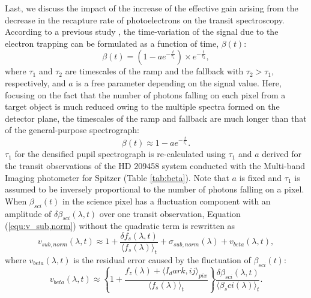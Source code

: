 \documentclass{aastex62}
\def\hoge<#1>{\langle #1 \rangle}
\begin{document}
Last, we discuss the impact of the increase of the effective gain arising from the decrease in the recapture rate of photoelectrons on the transit spectroscopy. According to a previous study \citep{2012ApJ...752...81C}, the time-variation of the signal due to the electron trapping can be formulated as a function of time, $\beta(t)$:
\begin{equation}
\beta(t) = (1-ae^{-\frac{t}{\tau_{1}}}){\times}e^{-\frac{t}{\tau_{2}}} ,
\end{equation}
where $\tau_{1}$ and $\tau_{2}$ are timescales of the ramp and the fallback with $\tau_{2}>\tau_{1}$, respectively, and $a$ is a free parameter depending on the signal value. Here, focusing on the fact that the number of photons falling on each pixel from a target object is much reduced owing to the multiple spectra formed on the detector plane, the timescales of the ramp and fallback are much longer than that of the general-purpose spectrograph:
\begin{equation}
\label{equ:beta}
\beta(t) \approx 1-ae^{-\frac{t}{\tau_{1}}} .
\end{equation}
$\tau_{1}$ for the densified pupil spectrograph is re-calculated using $\tau_{1}$ and $a$ derived for the transit observations of the HD 209458 system conducted with the Multi-band Imaging photometer for Spitzer \citep{2012ApJ...752...81C} (Table \ref{tab:beta}). Note that $a$ is fixed and $\tau_{1}$ is assumed to be inversely proportional to the number of photons falling on a pixel. When $\beta_{sci}(t)$ in the science pixel has a fluctuation component with an amplitude of ${\delta}\beta_{sci}(\lambda,t)$ over one transit observation, Equation (\ref{equ:v_sub,norm}) without the quadratic term is rewritten as
\begin{equation}
v_{sub,norm}(\lambda,t) \approx 1+\frac{{\delta}f_{s}(\lambda,t)}{\hoge<f_{s}(\lambda)>_{t}}+\sigma_{sub,norm}(\lambda)+v_{beta}(\lambda,t) ,
\end{equation}
where $v_{beta}(\lambda,t)$ is the residual error caused by the fluctuation of $\beta_{sci}(t)$:
\begin{equation}
v_{beta}(\lambda,t) \approx \left\{1+\frac{f_{z}(\lambda)+\hoge<I_{dark,ij}>_{pix}}{\hoge<f_{s}(\lambda)>_{t}}\right\}\frac{{\delta}\beta_{sci}(\lambda,t)}{\hoge<\beta_{sci}(\lambda)>_{t}} .
\end{equation}
\end{document}
